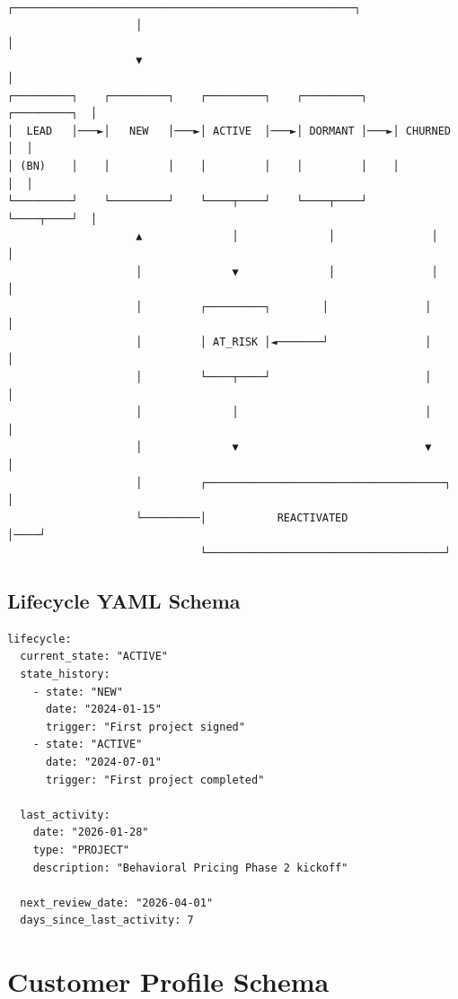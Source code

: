 \begin{verbatim}
                    ┌─────────────────────────────────────────────────────┐
                    │                                                     │
                    ▼                                                     │
┌─────────┐    ┌─────────┐    ┌─────────┐    ┌─────────┐    ┌─────────┐  │
│  LEAD   │───►│   NEW   │───►│ ACTIVE  │───►│ DORMANT │───►│ CHURNED │  │
│ (BN)    │    │         │    │         │    │         │    │         │  │
└─────────┘    └─────────┘    └────┬────┘    └────┬────┘    └────┬────┘  │
                    ▲              │              │               │       │
                    │              ▼              │               │       │
                    │         ┌─────────┐        │               │       │
                    │         │ AT_RISK │◄───────┘               │       │
                    │         └────┬────┘                        │       │
                    │              │                             │       │
                    │              ▼                             ▼       │
                    │         ┌─────────────────────────────────────┐    │
                    └─────────│           REACTIVATED              │────┘
                              └─────────────────────────────────────┘
\end{verbatim}

\subsection{Lifecycle YAML Schema}

\begin{verbatim}
lifecycle:
  current_state: "ACTIVE"
  state_history:
    - state: "NEW"
      date: "2024-01-15"
      trigger: "First project signed"
    - state: "ACTIVE"
      date: "2024-07-01"
      trigger: "First project completed"

  last_activity:
    date: "2026-01-28"
    type: "PROJECT"
    description: "Behavioral Pricing Phase 2 kickoff"

  next_review_date: "2026-04-01"
  days_since_last_activity: 7
\end{verbatim}


\section{Customer Profile Schema}
\label{sec:bp-schema}

